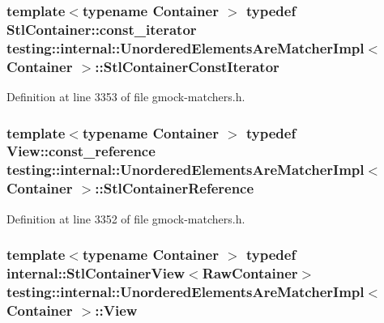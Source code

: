 \subsubsection[{\texorpdfstring{Stl\+Container\+Const\+Iterator}{StlContainerConstIterator}}]{\setlength{\rightskip}{0pt plus 5cm}template$<$typename Container $>$ typedef Stl\+Container\+::const\+\_\+iterator {\bf testing\+::internal\+::\+Unordered\+Elements\+Are\+Matcher\+Impl}$<$ Container $>$\+::{\bf Stl\+Container\+Const\+Iterator}}\hypertarget{classtesting_1_1internal_1_1_unordered_elements_are_matcher_impl_a656c30399e17043db476b639dcd4e6fa}{}\label{classtesting_1_1internal_1_1_unordered_elements_are_matcher_impl_a656c30399e17043db476b639dcd4e6fa}


Definition at line 3353 of file gmock-\/matchers.\+h.

\subsubsection[{\texorpdfstring{Stl\+Container\+Reference}{StlContainerReference}}]{\setlength{\rightskip}{0pt plus 5cm}template$<$typename Container $>$ typedef {\bf View\+::const\+\_\+reference} {\bf testing\+::internal\+::\+Unordered\+Elements\+Are\+Matcher\+Impl}$<$ Container $>$\+::{\bf Stl\+Container\+Reference}}\hypertarget{classtesting_1_1internal_1_1_unordered_elements_are_matcher_impl_acf64d0e328361d4796bcf1aeb91ed975}{}\label{classtesting_1_1internal_1_1_unordered_elements_are_matcher_impl_acf64d0e328361d4796bcf1aeb91ed975}


Definition at line 3352 of file gmock-\/matchers.\+h.

\subsubsection[{\texorpdfstring{View}{View}}]{\setlength{\rightskip}{0pt plus 5cm}template$<$typename Container $>$ typedef {\bf internal\+::\+Stl\+Container\+View}$<$Raw\+Container$>$ {\bf testing\+::internal\+::\+Unordered\+Elements\+Are\+Matcher\+Impl}$<$ Container $>$\+::{\bf View}}\hypertarget{classtesting_1_1internal_1_1_unordered_elements_are_matcher_impl_adbd6dfef7713dd30d569b4220eb808d3}{}\label{classtesting_1_1internal_1_1_unordered_elements_are_matcher_impl_adbd6dfef7713dd30d569b4220eb808d3}



